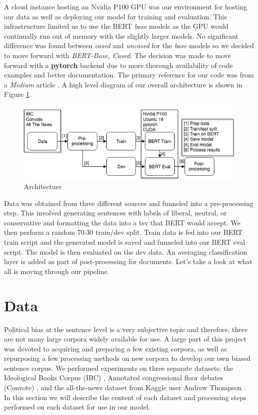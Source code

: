 \documentclass[10pt,a4paper,onecolumn]{article}
\begin{document}
A cloud instance hosting an Nvidia P100 GPU was our environment for hosting our data as well as deploying our model for training and evaluation. This infrastructure limited us to use the BERT \textit{base} models as the GPU would continually run out of memory with the slightly larger models. No significant difference was found between \textit{cased} and \textit{uncased} for the \textit{base} models so we decided to move forward with \textit{BERT-Base, Cased}. The decision was made to move forward with a \textbf{pytorch} backend due to more thorough availability of code examples and better documentation. The primary reference for our code was from a \textit{Medium} article \cite{usingbert}. A high level diagram of our overall architecture is shown in Figure \ref{fig:architecture}.
\begin{figure}[h]
	\begin{center}
		\includegraphics[width=0.8\linewidth]{architecture.png}
		\caption{Architecture}
		\label{fig:architecture}
	\end{center}
\end{figure}
Data was obtained from three different sources and funneled into a pre-processing step. This involved generating sentences with labels of liberal, neutral, or conservative and formatting the data into a tsv that BERT would accept. We then perform a random 70:30 train/dev split. Train data is fed into our BERT train script and the generated model is saved and funneled into our BERT eval script. The model is then evaluated on the dev data. An averaging classification layer is added as part of post-processing for documents. Let's take a look at what all is moving through our pipeline. 

\section{Data}
\label{sec:data}
Political bias at the sentence level is a very subjective topic and therefore, there are not many large corpora widely available for use. A large part of this project was devoted to acquiring and preparing a few existing corpora, as well as repurposing a few processing methods on new corpora to develop our own biased sentence corpus. We performed experiments on three separate datasets: the Ideological Books Corpus (IBC) \cite{iyyerRNN}, Annotated congressional floor debates (Convote) \cite{convote}, and the all-the-news dataset from Kaggle user Andrew Thompson \cite{news}. In this section we will describe the content of each dataset and processing steps performed on each dataset for use in our model.
\end{document}
